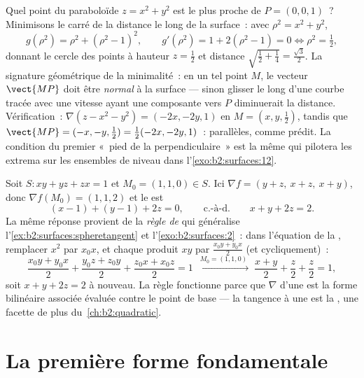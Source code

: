 \begin{example}\label{ex:b2:surfaces:closest}
Quel point du paraboloïde $z = x^2 + y^2$ est le plus proche de
$P = (0, 0, 1)$~? Minimisons le carré de la distance le long de la
surface~: avec $\rho^2 = x^2 + y^2$,
\[
g(\rho^2) = \rho^2 + (\rho^2 - 1)^2,
\qquad
g'(\rho^2) = 1 + 2(\rho^2 - 1) = 0
\iff \rho^2 = \tfrac12 ,
\]
donnant le cercle des points à hauteur $z = \frac12$ et
distance $\sqrt{\tfrac12 + \tfrac14} = \frac{\sqrt3}2$. La
signature géométrique de la minimalité~: en un tel point $M$, le
vecteur $\vect{MP}$ doit être \emph{normal} à la surface ---
sinon glisser le long d'une courbe tracée avec une vitesse ayant
une composante vers $P$ diminuerait la distance. Vérification~:
$\nabla(z - x^2 - y^2) = (-2x, -2y, 1)$ en $M = (x, y,
\tfrac12)$, tandis que $\vect{MP} = (-x, -y, \tfrac12) =
\tfrac12(-2x, -2y, 1)$~: parallèles, comme prédit. La
condition du premier  «~pied de la perpendiculaire~» est la
même qui pilotera les extrema sur les ensembles de niveau dans
l'\cref{exo:b2:surfaces:12}.
\end{example}

\begin{example}\label{ex:b2:surfaces:polarization}
Soit $S : xy + yz + zx = 1$ et $M_0 = (1, 1, 0) \in S$. Ici
$\nabla f = (y + z,\ x + z,\ x + y)$, donc $\nabla f(M_0) = (1,
1, 2)$ et le  est
\[
(x - 1) + (y - 1) + 2z = 0,
\qquad\text{c.-à-d.}\qquad x + y + 2z = 2 .
\]
La même réponse provient de la \emph{règle de } qui
généralise l'\cref{ex:b2:surfaces:spheretangent} et
l'\cref{exo:b2:surfaces:2}~: dans l'équation de la ,
remplacer $x^2$ par $x_0x$, et chaque produit $xy$ par
$\frac{x_0y + y_0x}2$ (et cycliquement)~:
\[
\frac{x_0y + y_0x}2 + \frac{y_0z + z_0y}2 + \frac{z_0x +
x_0z}2 = 1
\;\xrightarrow{\ M_0 = (1,1,0)\ }\;
\frac{x + y}2 + \frac z2 + \frac z2 = 1 ,
\]
soit $x + y + 2z = 2$ à nouveau. La règle fonctionne parce que
$\nabla$ d'une  est la forme bilinéaire associée
évaluée contre le point de base --- la tangence à une 
est la , une facette de plus du~\cref{ch:b2:quadratic}.
\end{example}

\section{La première forme fondamentale}

